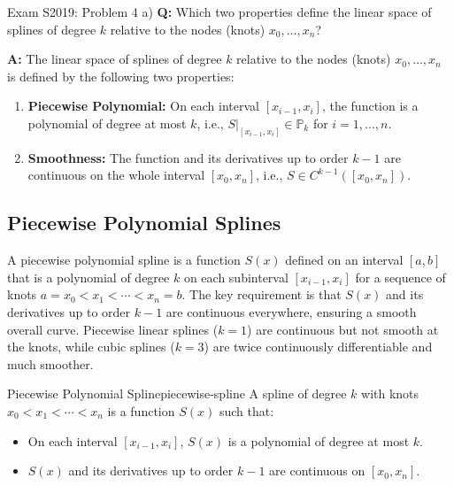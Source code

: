 \begin{example}{Exam S2019: Problem 4 a)}{}
    \textbf{Q:} Which two properties define the linear space of splines of degree \(k\) relative to the nodes (knots) \(x_0, \ldots, x_n\)?

    \textbf{A:} The linear space of splines of degree \(k\) relative to the nodes (knots) \(x_0, \ldots, x_n\) is defined by the following two properties:

    \begin{enumerate}[label=(\roman*)]
        \item \textbf{Piecewise Polynomial:} On each interval \([x_{i-1}, x_i]\), the function is a polynomial of degree at most \(k\), i.e., \(S|_{[x_{i-1}, x_i]} \in \mathbb{P}_k\) for \(i = 1, \ldots, n\).
        \item \textbf{Smoothness:} The function and its derivatives up to order \(k-1\) are continuous on the whole interval \([x_0, x_n]\), i.e., \(S \in C^{k-1}([x_0, x_n])\).
    \end{enumerate}

\end{example}

\subsection{Piecewise Polynomial Splines}
A piecewise polynomial spline is a function \(S(x)\) defined on an interval \([a, b]\) that is a polynomial of degree \(k\) on each subinterval \([x_{i-1}, x_i]\) for a sequence of knots \(a = x_0 < x_1 < \cdots < x_n = b\). The key requirement is that \(S(x)\) and its derivatives up to order \(k-1\) are continuous everywhere, ensuring a smooth overall curve. Piecewise linear splines (\(k=1\)) are continuous but not smooth at the knots, while cubic splines (\(k=3\)) are twice continuously differentiable and much smoother.
\begin{definition}{Piecewise Polynomial Spline}{piecewise-spline}
    A spline of degree \(k\) with knots \(x_0 < x_1 < \cdots < x_n\) is a function \(S(x)\) such that:
    \begin{itemize}[nosep]
        \item On each interval \([x_{i-1}, x_i]\), \(S(x)\) is a polynomial of degree at most \(k\).
        \item \(S(x)\) and its derivatives up to order \(k-1\) are continuous on \([x_0, x_n]\).
    \end{itemize}
\end{definition}

